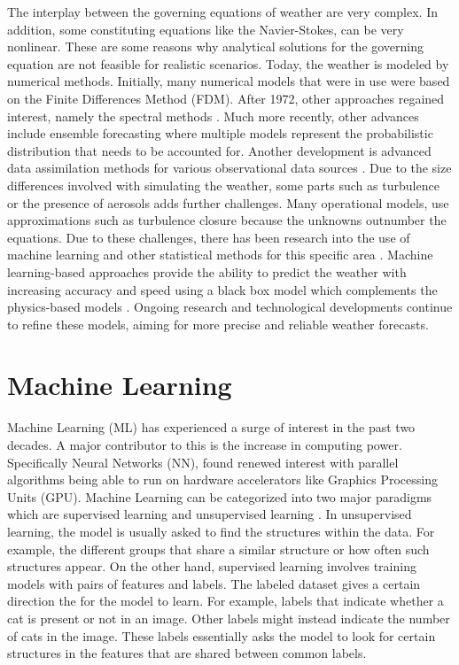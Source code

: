 The interplay between the governing equations of weather are very complex. In addition, some constituting equations like the Navier-Stokes, can be very nonlinear. These are some reasons why analytical solutions for the governing equation are not feasible for realistic scenarios. Today, the weather is modeled by numerical methods. Initially, many numerical models that were in use were based on the Finite Differences Method (FDM). After 1972, other approaches regained interest, namely the spectral methods \autocite{puNumericalWeatherPrediction2018,mengaldoCurrentEmergingTimeIntegration2019}. Much more recently, other advances include ensemble forecasting where multiple models represent the probabilistic distribution that needs to be accounted for. Another development is advanced data assimilation methods for various observational data sources \autocite{parkDataAssimilationAtmospheric2013}. Due to the size differences involved with simulating the weather, some parts such as turbulence or the presence of aerosols adds further challenges. Many operational models, use approximations such as turbulence closure because the unknowns outnumber the equations. Due to these challenges, there has been research into the use of machine learning and other statistical methods for this specific area \autocite{langAIFSECMWFDatadriven2024,bonevSphericalFourierNeural2023}. Machine learning-based approaches provide the ability to predict the weather with increasing accuracy and speed using a black box model which complements the physics-based models \autocite{biAccurateMediumrangeGlobal2023}. Ongoing research and technological developments continue to refine these models, aiming for more precise and reliable weather forecasts.

\section{Machine Learning}
\noindent Machine Learning (ML) has experienced a surge of interest in the past two decades. A major contributor to this is the increase in computing power. Specifically Neural Networks (NN), found renewed interest with parallel algorithms being able to run on hardware accelerators like Graphics Processing Units (GPU). Machine Learning can be categorized into two major paradigms which are supervised learning and unsupervised learning \autocite{alpaydinIntroductionMachineLearning2020}. In unsupervised learning, the model is usually asked to find the structures within the data. For example, the different groups that share a similar structure or how often such structures appear. On the other hand, supervised learning involves training models with pairs of features and labels. The labeled dataset gives a certain direction the for the model to learn. For example, labels that indicate whether a cat is present or not in an image. Other labels might instead indicate the number of cats in the image. These labels essentially asks the model to look for certain structures in the features that are shared between common labels.

